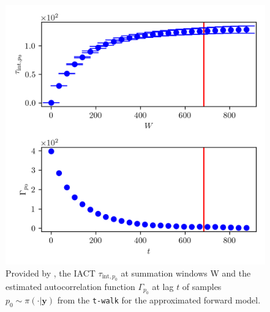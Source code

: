 \begin{figure}[ht!]
	\centering
	\includegraphics{UwerrTauIntTWalk5.png}
	\caption[IACT and autocorrelation function of samples $p_0 \sim \pi(\cdot|\bm{y})$, for approximated model.]{Provided by \cite{drikHesse}, the IACT $\tau_{\text{int},p_0}$ at summation windows W and the estimated autocorrelation function $\Gamma_{p_0}$ at lag $t$ of samples $p_0 \sim \pi( \cdot| \bm{y})$ from the \texttt{t-walk} for the approximated forward model.}
	\label{fig:TWalkIATC6}
\end{figure}


